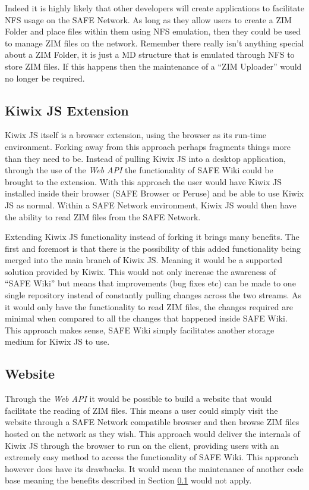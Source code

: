 Indeed it is highly likely that other developers will create applications to facilitate NFS usage on the SAFE Network. As long as they allow users to create a ZIM Folder and place files within them using NFS emulation, then they could be used to manage ZIM files on the network. Remember there really isn't anything special about a ZIM Folder, it is just a MD structure that is emulated through NFS to store ZIM files. If this happens then the maintenance of a ``ZIM Uploader'' would no longer be required.

\subsection{Kiwix JS Extension}
\label{subsec:kiwix-js-safe}

Kiwix JS itself is a browser extension, using the browser as its run-time environment. Forking away from this approach perhaps fragments things more than they need to be. Instead of pulling Kiwix JS into a desktop application, through the use of the \textit{Web API} the functionality of SAFE Wiki could be brought to the extension. With this approach the user would have Kiwix JS installed inside their browser (SAFE Browser or Peruse) and be able to use Kiwix JS as normal. Within a SAFE Network environment, Kiwix JS would then have the ability to read ZIM files from the SAFE Network.

Extending Kiwix JS functionality instead of forking it brings many benefits. The first and foremost is that there is the possibility of this added functionality being merged into the main branch of Kiwix JS. Meaning it would be a supported solution provided by Kiwix. This would not only increase the awareness of ``SAFE Wiki'' but means that improvements (bug fixes etc) can be made to one single repository instead of constantly pulling changes across the two streams. As it would only have the functionality to read ZIM files, the changes required are minimal when compared to all the changes that happened inside SAFE Wiki. This approach makes sense, SAFE Wiki simply facilitates another storage medium for Kiwix JS to use.

\subsection{Website}

Through the \textit{Web API} it would be possible to build a website that would facilitate the reading of ZIM files. This means a user could simply visit the website through a SAFE Network compatible browser and then browse ZIM files hosted on the network as they wish. This approach would deliver the internals of Kiwix JS through the browser to run on the client, providing users with an extremely easy method to access the functionality of SAFE Wiki. This approach however does have its drawbacks. It would mean the maintenance of another code base meaning the benefits described in Section \ref{subsec:kiwix-js-safe} would not apply.

